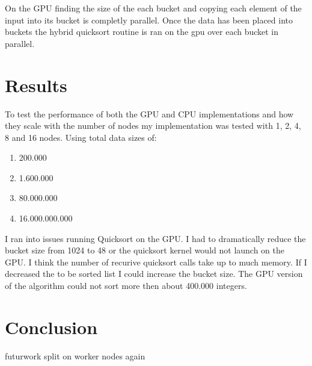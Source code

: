 \documentclass[lang=en, hanging-titles=true]{skrapport}
\begin{document}
On the GPU finding the size of the each bucket and copying each element of the input into its bucket is completly parallel. Once the data has been placed into buckets the hybrid quicksort routine is ran on the gpu over each bucket in parallel.

\section{Results}
To test the performance of both the GPU and CPU implementations and how they scale with the number of nodes my implementation was tested with 1, 2, 4, 8 and 16 nodes. Using total data sizes of:

\begin{enumerate}
	\item 200.000
	\item 1.600.000
	\item 80.000.000
	\item 16.000.000.000
\end{enumerate}

I ran into issues running Quicksort on the GPU. I had to dramatically reduce the bucket size from 1024 to 48 or the quicksort kernel would not launch on the GPU. I think the number of recurive quicksort calls take up to much memory. If I decreased the to be sorted list I could increase the bucket size. The GPU version of the algorithm could not sort more then about 400.000 integers.



\section{Conclusion}


futurwork
split on worker nodes again

%

\clearpage
\appendix
% 
\end{document}

